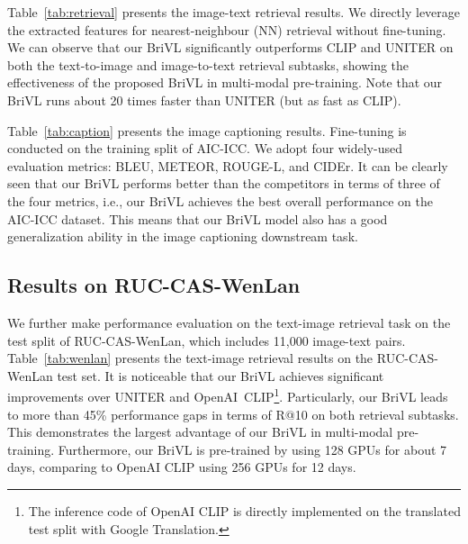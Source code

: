 \documentclass[10pt,twocolumn,letterpaper]{article}
\begin{document}
Table~\ref{tab:retrieval} presents the image-text retrieval results. We directly leverage the extracted features for nearest-neighbour (NN) retrieval without fine-tuning. We can observe that our BriVL significantly outperforms CLIP and UNITER on both the text-to-image and image-to-text retrieval subtasks, showing the effectiveness of the proposed BriVL in multi-modal pre-training. Note that our BriVL runs about 20 times faster than UNITER (but as fast as CLIP).

Table~\ref{tab:caption} presents the image captioning results. Fine-tuning is conducted on the training split of AIC-ICC. We adopt four widely-used evaluation metrics: BLEU, METEOR, ROUGE-L, and CIDEr. It can be clearly seen that our BriVL performs better than the competitors in terms of three of the four metrics, i.e., our BriVL achieves the best overall performance on the AIC-ICC dataset. This means that our BriVL model also has a good generalization ability in the image captioning downstream task.

\begin{table}[t]
    \centering
    \caption{Evaluation results for the text-image retrieval downstream task on the RUC-CAS-WenLan test set.}
    \vspace{0.03in}
    \label{tab:wenlan}
    \footnotesize
\end{table}

\subsection{Results on RUC-CAS-WenLan}
\label{sec:expwenlan}

We further make performance evaluation on the text-image retrieval task on the test split of RUC-CAS-WenLan, which includes 11,000 image-text pairs. Table~\ref{tab:wenlan} presents the text-image retrieval results on the RUC-CAS-WenLan test set. It is noticeable that our BriVL achieves significant improvements over UNITER and OpenAI~CLIP\footnote{The inference code of OpenAI CLIP is directly implemented on the translated test split with Google Translation.}. Particularly, our BriVL leads to more than 45\% performance gaps in terms of R@10 on both retrieval subtasks. This demonstrates the largest advantage of our BriVL in multi-modal pre-training. Furthermore, our BriVL is pre-trained by using 128 GPUs for about 7 days, comparing to OpenAI CLIP using 256 GPUs for 12 days.
\end{document}
